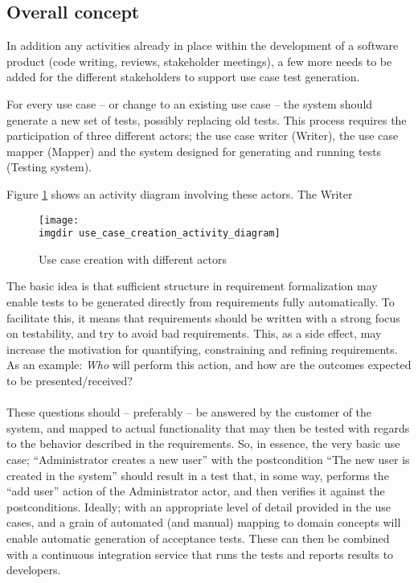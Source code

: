 \subsection{Overall concept}
In addition any activities already in place within the development of a software product (code writing, reviews, stakeholder meetings), a few more needs to be added for the different stakeholders to support use case test generation.\medskip

\noindent For every use case -- or change to an existing use case -- the system should generate a new set of tests, possibly replacing old tests. This process requires the participation of three different actors; the use case writer (Writer), the use case mapper (Mapper) and the system designed for generating and running tests (Testing system).\medskip

Figure \ref{fig:use_case_creation_activity_diagram} shows an activity diagram involving these actors. The Writer 
\begin{figure}[!htbp]
\texttt{[image: \\imgdir use\_case\_creation\_activity\_diagram]}
\centering
\caption{Use case creation with different actors}
\label{fig:use_case_creation_activity_diagram}
\end{figure}
\noindent The basic idea is that sufficient structure in requirement formalization may enable tests to be generated directly from requirements fully automatically. To facilitate this, it means that requirements should be written with a strong focus on testability, and try to avoid bad requirements. This, as a side effect, may increase the motivation for quantifying, constraining and refining requirements. As an example: \emph{Who} will perform this action, and how are the outcomes expected to be presented/received?\\\\
These questions should -- preferably -- be answered by the customer of the system, and mapped to actual functionality that may then be tested with regards to the behavior described in the requirements. So, in essence, the very basic use case; ``Administrator creates a new user'' with the postcondition ``The new user is created in the system'' should result in a test that, in some way, performs the ``add user'' action of the Administrator actor, and then verifies it against the postconditions. Ideally; with an appropriate level of detail provided in the use cases, and a grain of automated (and manual) mapping to domain concepts will enable automatic generation of acceptance tests. These can then be combined with a continuous integration service that runs the tests and reports results to developers.\medskip

